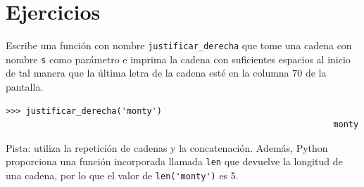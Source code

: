 \documentclass[10pt]{book}
\begin{document}
\section{Ejercicios}

\begin{exercise}

Escribe una función con nombre \verb"justificar_derecha" que tome una cadena
con nombre {\tt s} como parámetro e imprima la cadena con suficientes
espacios al inicio de tal manera que la última letra de la cadena esté en la columna 70
de la pantalla.

\begin{verbatim}
>>> justificar_derecha('monty')
                                                                 monty
\end{verbatim}

Pista: utiliza la repetición de cadenas y la concatenación.  Además,
Python proporciona una función incorporada llamada {\tt len} que
devuelve la longitud de una cadena, por lo que el valor de \verb"len('monty')" es 5.

\end{exercise}
\end{document}

